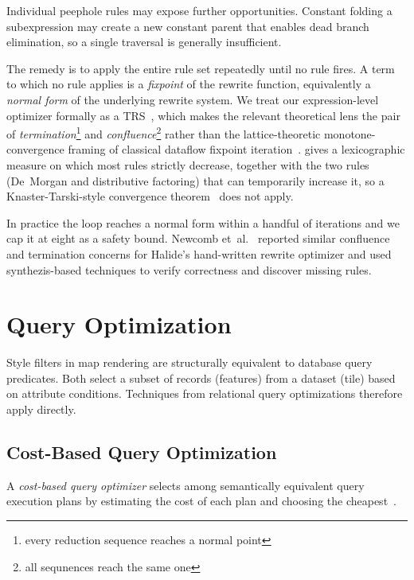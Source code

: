 Individual peephole rules may expose further opportunities.
Constant folding a subexpression may create a new constant parent that enables dead branch elimination, so a single traversal is generally insufficient.

The remedy is to apply the entire rule set repeatedly until no rule fires.
A term to which no rule applies is a \emph{fixpoint} of the rewrite function, equivalently a \emph{normal form} of the underlying rewrite system.
We treat our expression-level optimizer formally as a \ac{TRS}~\cite{baaderTermRewritingAll1999}, which makes the relevant theoretical lens the pair of \emph{termination}\footnote{every reduction sequence reaches a normal point} and \emph{confluence}\footnote{all sequnences reach the same one} rather than the lattice-theoretic monotone-convergence framing of classical dataflow fixpoint iteration~\cite{ahoCompilersPrinciplesTechniques2007}.
 gives a lexicographic measure on which most rules strictly decrease, together with the two rules (De~Morgan and distributive factoring) that can temporarily increase it, so a Knaster-Tarski-style convergence theorem~\cite{tarskiLatticetheoreticalFixpointTheorem1955} does not apply.

In practice the loop reaches a normal form within a handful of iterations and we cap it at eight as a safety bound.
Newcomb et~al.~\cite{newcombVerifyingImprovingHalides2020} reported similar confluence and termination concerns for Halide's hand-written rewrite optimizer and used synthezis-based techniques to verify correctness and discover missing rules.

\section{Query Optimization}\label{sec:query_optimizations}

Style filters in map rendering are structurally equivalent to database query predicates.
Both select a subset of records (features) from a dataset (tile) based on attribute conditions.
Techniques from relational query optimizations therefore apply directly.

\subsection{Cost-Based Query Optimization}

A \emph{cost-based query optimizer} selects among semantically equivalent query execution plans by estimating the cost of each plan and choosing the cheapest~\cite{selingerAccessPathSelection1979}.

